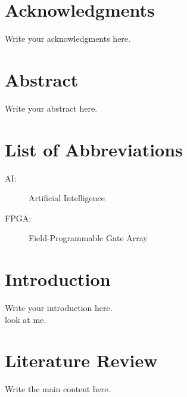 \section*{Acknowledgments}
Write your acknowledgments here.
\newpage

\section*{Abstract}
Write your abstract here.
\newpage

\tableofcontents
\thispagestyle{fancy}
\newpage

\listoffigures
\thispagestyle{fancy}
\newpage

\listoftables
\thispagestyle{fancy}
\newpage

\section*{List of Abbreviations}
\thispagestyle{fancy}
\begin{description}
  \item[AI:] Artificial Intelligence
  \item[FPGA:] Field-Programmable Gate Array
\end{description}
\newpage


\section{Introduction}
Write your introduction here. \\
look at me.

\section{Literature Review}
Write the main content here.

